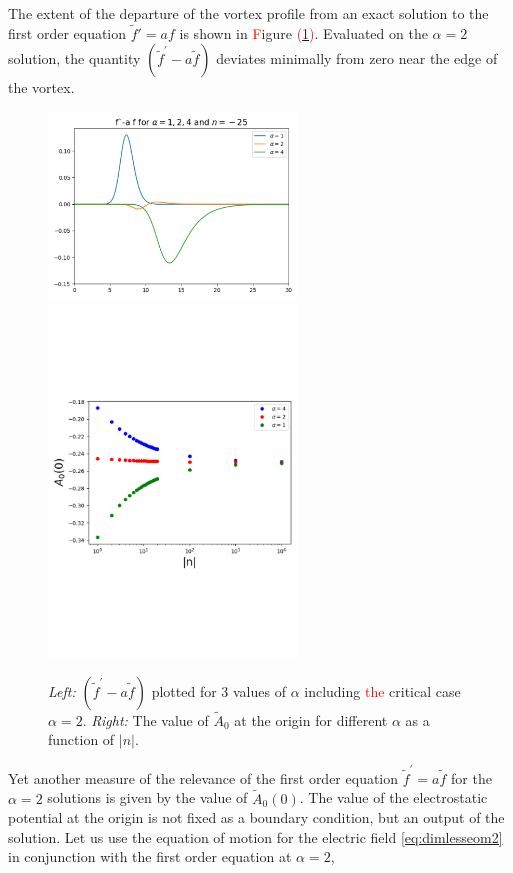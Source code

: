 The extent of the departure of the vortex profile from an exact solution to the  first order equation $\tilde f'=a f$ is shown in \textcolor{red}{F}igure \textcolor{red}{(}\ref{fig:error}\textcolor{red}{)}.  Evaluated on the $\alpha=2$ solution, the quantity $(\tilde f^\prime - a \tilde f)$ deviates minimally from zero near the edge of the vortex.
\begin{figure}[H]
\begin{center}
    \includegraphics[width=2.6in]{Chapter_2_Folder_1912.11321/figures/BPS_equation_error.pdf}\qquad\includegraphics[width=2.6in]{Chapter_2_Folder_1912.11321/figures/negative_n_A0.pdf}
     \caption[Plots of $\tilde{f}(r)' - a(r) \tilde{f}(r)$ for 3 values of $\alpha$ and $\tilde{A}_0(0)$ for different values of $|n|$ and $\alpha$.]{{\small {\it Left: }$\left(\tilde f^\prime - a \tilde f\right)$ plotted for 3 values of $\alpha$ including \textcolor{red}{the} critical case\colorbox{red}{ } $\alpha=2$. {\it Right:} The value of $\tilde A_0$ at the origin for different $\alpha$ as a function of $|n|$. }} \label{fig:error}
    \end{center}
\end{figure}
Yet another measure of the relevance of the first order equation $\tilde f^\prime = a \tilde f$ for the $\alpha=2$ solutions is given by the value of $\tilde A_0(0)$. The value of the electrostatic potential at the origin is not fixed as a boundary condition, but an output of the solution. Let us use the equation of motion for the electric field \eqref{eq:dimlesseom2} in conjunction with the first order equation at $\alpha=2$,
